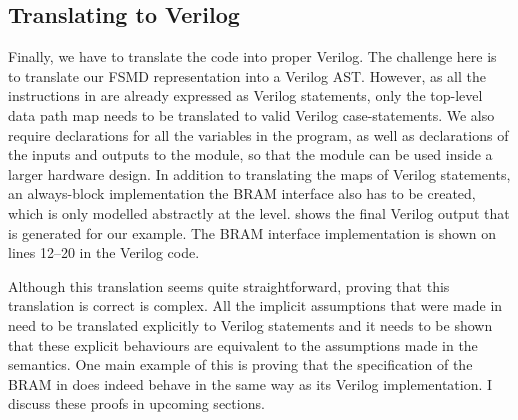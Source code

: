 \subsection{Translating \htl{} to Verilog}

Finally, we have to translate the \htl{} code into proper
Verilog. %
The challenge here is to translate our FSMD representation into a Verilog AST.
However, as all the instructions in \htl{} are already expressed as Verilog
statements, only the top-level data path map needs to be translated to valid
Verilog case-statements.  We also require declarations for all the variables in
the program, as well as declarations of the inputs and outputs to the module, so
that the module can be used inside a larger hardware design.  In addition to
translating the maps of Verilog statements, an always-block implementation the
\gls{BRAM} interface also has to be created, which is only modelled abstractly
at the \htl{} level.   shows the final Verilog output
that is generated for our example.  The \gls{BRAM} interface implementation is
shown on lines 12--20 in the Verilog code.

Although this translation seems quite straight\-forward, proving that this
translation is correct is complex.  All the implicit assumptions that were made
in \htl{} need to be translated explicitly to Verilog statements and it needs to
be shown that these explicit behaviours are equivalent to the assumptions made
in the \htl{} semantics.  One main example of this is proving that the
specification of the \gls{BRAM} in \htl{} does indeed behave in the same way as
its Verilog implementation.  I discuss these proofs in upcoming sections.


